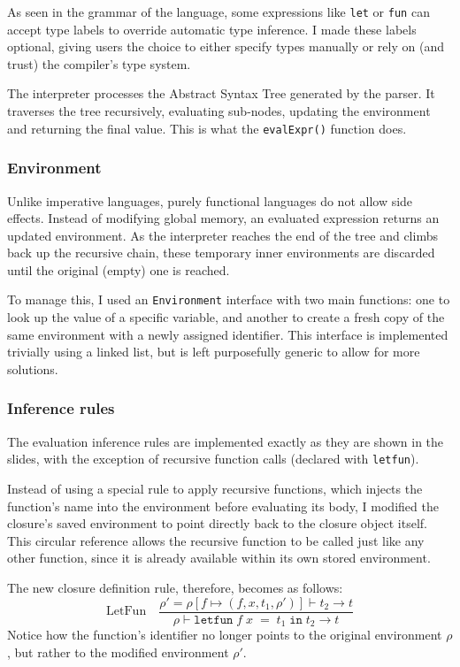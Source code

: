 \documentclass[12pt]{article}
\newcommand{\Code}[1]{\texttt{#1}}
\begin{document}
As seen in the grammar of the language, some expressions like \Code{let} or
\Code{fun} can accept type labels to override automatic type inference. I
made these labels optional, giving users the choice to either specify types
manually or rely on (and trust) the compiler's type system.

The interpreter processes the Abstract Syntax Tree generated by the parser. It
traverses the tree recursively, evaluating sub-nodes, updating the environment
and returning the final value. This is what the \Code{evalExpr()} function
does.

\subsubsection{Environment}

Unlike imperative languages, purely functional languages do not allow side
effects. Instead of modifying global memory, an evaluated expression returns an
updated environment. As the interpreter reaches the end of the tree and climbs
back up the recursive chain, these temporary inner environments are discarded
until the original (empty) one is reached.

To manage this, I used an \Code{Environment} interface with two main functions:
one to look up the value of a specific variable, and another to create a fresh
copy of the same environment with a newly assigned identifier. This interface is
implemented trivially using a linked list, but is left purposefully generic to
allow for more solutions.

\subsubsection{Inference rules}

The evaluation inference rules are implemented exactly as they are shown in the
slides, with the exception of recursive function calls (declared with
\texttt{letfun}).

Instead of using a special rule to apply recursive functions, which injects the
function's name into the environment before evaluating its body, I modified the
closure's saved environment to point directly back to the closure object itself.
This circular reference allows the recursive function to be called just like any
other function, since it is already available within its own stored environment.

The new closure definition rule, therefore, becomes as follows:
$$
\text{LetFun}\quad
\frac
{ \rho' = \rho[f \mapsto (f, x, t_1, \rho')] \vdash t_2 \longrightarrow t }
{ \rho \vdash \texttt{letfun} \; f \; x \; = \; t_1 \; \texttt{in} \; t_2
\longrightarrow t }
$$
Notice how the function's identifier no longer points to the original
environment $\rho$, but rather to the modified environment $\rho'$.
\end{document}

